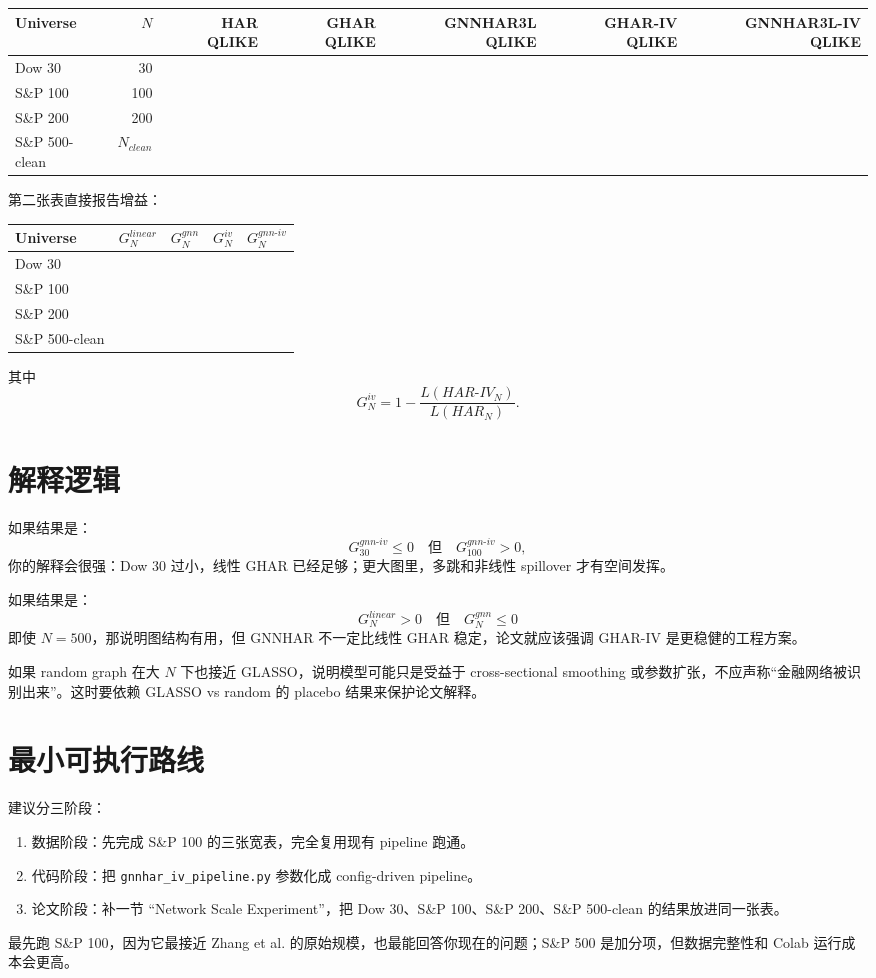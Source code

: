 \documentclass[11pt,a4paper]{ctexart}
\begin{document}
\begin{longtable}{lrrrrrr}
\toprule
Universe & \(N\) & HAR QLIKE & GHAR QLIKE & GNNHAR3L QLIKE & GHAR-IV QLIKE & GNNHAR3L-IV QLIKE \\
\midrule
\endhead
Dow 30 & 30 &  &  &  &  &  \\
S\&P 100 & 100 &  &  &  &  &  \\
S\&P 200 & 200 &  &  &  &  &  \\
S\&P 500-clean & \(N_{clean}\) &  &  &  &  &  \\
\bottomrule
\end{longtable}

第二张表直接报告增益：

\begin{longtable}{lrrrr}
\toprule
Universe & \(G^{linear}_N\) & \(G^{gnn}_N\) & \(G^{iv}_N\) & \(G^{gnn\text{-}iv}_N\) \\
\midrule
\endhead
Dow 30 &  &  &  &  \\
S\&P 100 &  &  &  &  \\
S\&P 200 &  &  &  &  \\
S\&P 500-clean &  &  &  &  \\
\bottomrule
\end{longtable}

其中
\[
G^{iv}_N=1-\frac{L(HAR\text{-}IV_N)}{L(HAR_N)}.
\]

\section{解释逻辑}

如果结果是：
\[
G^{gnn\text{-}iv}_{30}\leq 0
\quad\text{但}\quad
G^{gnn\text{-}iv}_{100}>0,
\]
你的解释会很强：Dow 30 过小，线性 GHAR 已经足够；更大图里，多跳和非线性 spillover 才有空间发挥。

如果结果是：
\[
G^{linear}_{N}>0
\quad\text{但}\quad
G^{gnn}_{N}\leq 0
\]
即使 \(N=500\)，那说明图结构有用，但 GNNHAR 不一定比线性 GHAR 稳定，论文就应该强调 GHAR-IV 是更稳健的工程方案。

如果 random graph 在大 \(N\) 下也接近 GLASSO，说明模型可能只是受益于 cross-sectional smoothing 或参数扩张，不应声称“金融网络被识别出来”。这时要依赖 GLASSO vs random 的 placebo 结果来保护论文解释。

\section{最小可执行路线}

建议分三阶段：

\begin{enumerate}[leftmargin=*]
\item 数据阶段：先完成 S\&P 100 的三张宽表，完全复用现有 pipeline 跑通。
\item 代码阶段：把 \texttt{gnnhar\_iv\_pipeline.py} 参数化成 config-driven pipeline。
\item 论文阶段：补一节 ``Network Scale Experiment''，把 Dow 30、S\&P 100、S\&P 200、S\&P 500-clean 的结果放进同一张表。
\end{enumerate}

最先跑 S\&P 100，因为它最接近 Zhang et al. 的原始规模，也最能回答你现在的问题；S\&P 500 是加分项，但数据完整性和 Colab 运行成本会更高。
\end{document}
